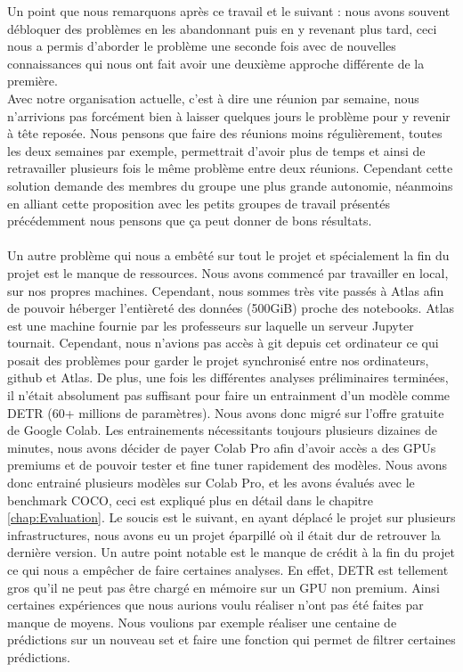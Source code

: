 Un point que nous remarquons après ce travail et le suivant : nous avons souvent débloquer des problèmes en les abandonnant puis en y revenant plus tard, ceci nous a permis d'aborder le problème une seconde fois avec de nouvelles connaissances qui nous ont fait avoir une deuxième approche différente de la première.
\\
Avec notre organisation actuelle, c'est à dire une réunion par semaine, nous n'arrivions pas forcément bien à laisser quelques jours le problème pour y revenir à tête reposée. Nous pensons que faire des réunions moins régulièrement, toutes les deux semaines par exemple, permettrait d'avoir plus de temps et ainsi de retravailler plusieurs fois le même problème entre deux réunions. Cependant cette solution demande des membres du groupe une plus grande autonomie, néanmoins en alliant cette proposition avec les petits groupes de travail présentés précédemment nous pensons que ça peut donner de bons résultats.

\paragraph{}
Un autre problème qui nous a embêté sur tout le projet et spécialement la fin du projet est le manque de ressources. Nous avons commencé par travailler en local, sur nos propres machines. Cependant, nous sommes très vite passés à Atlas afin de pouvoir héberger l'entièreté des données (500GiB) proche des notebooks. Atlas est une machine fournie par les professeurs sur laquelle un serveur Jupyter tournait. Cependant, nous n'avions pas accès à git depuis cet ordinateur ce qui posait des problèmes pour garder le projet synchronisé entre nos ordinateurs, github et Atlas. De plus, une fois les différentes analyses préliminaires terminées, il n'était absolument pas suffisant pour faire un entrainment d'un modèle comme DETR (60+ millions de paramètres). Nous avons donc migré sur l'offre gratuite de Google Colab. Les entrainements nécessitants toujours plusieurs dizaines de minutes, nous avons décider de payer Colab Pro afin d'avoir accès a des GPUs premiums 
et de pouvoir tester et fine tuner rapidement des modèles. Nous avons donc entrainé plusieurs modèles sur Colab Pro, et les avons évalués avec le benchmark COCO, ceci est expliqué plus en détail dans le chapitre \ref{chap:Evaluation}. Le soucis est le suivant, en ayant déplacé le projet sur plusieurs infrastructures, nous avons eu un projet éparpillé où il était dur de retrouver la dernière version. Un autre point notable est le manque de crédit à la fin du projet ce qui nous a empêcher de faire certaines analyses. En effet, DETR est tellement gros qu'il ne peut pas être chargé en mémoire sur un GPU non premium. Ainsi certaines expériences que nous aurions voulu réaliser n'ont pas été faites par manque de moyens. Nous voulions par exemple réaliser une centaine de prédictions sur un nouveau set et faire une fonction qui permet de filtrer certaines prédictions.
